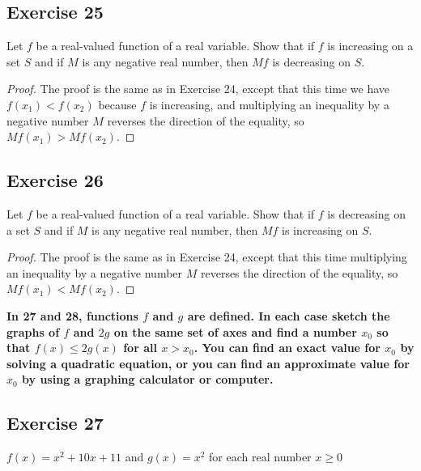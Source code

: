 \documentclass[14pt]{extarticle}
\newcommand{\cy}{\color{cyan}}
\begin{document}
\subsection{Exercise 25}
Let \(f\) be a real-valued function of a real variable. Show that if \(f\) is increasing on a set \(S\) and if \(M\) is any
negative real number, then \(Mf\) is decreasing on \(S\).

\begin{proof}
    The proof is the same as in Exercise 24, except that this time we have \(f(x_1) < f(x_2)\) because \(f\) is increasing, and
    multiplying an inequality by a negative number \(M\) reverses
    the direction of the equality, so \(Mf(x_1) > Mf(x_2)\).
\end{proof}

\subsection{Exercise 26}
Let \(f\) be a real-valued function of a real variable. Show that if \(f\) is decreasing on a set \(S\) and if \(M\) is any
negative real number, then \(Mf\) is increasing on \(S\).

\begin{proof}
    The proof is the same as in Exercise 24, except that this time
    multiplying an inequality by a negative number \(M\) reverses
    the direction of the equality, so \(Mf(x_1) < Mf(x_2)\).
\end{proof}

{\bf \cy In 27 and 28, functions \(f\) and \(g\) are defined. In each case sketch the graphs of \(f\) and \(2g\) on the same
set of axes and find a number \(x_0\) so that \(f(x) \leq 2g(x)\) for all \(x > x_0\). You can find an exact value for
\(x_0\) by solving a quadratic equation, or you can find an approximate value for \(x_0\) by using a graphing calculator
or computer.}

\subsection{Exercise 27}
\(f(x) = x^2 + 10x + 11\) and \(g(x) = x^2\) for each real number \(x \geq 0\)
\end{document}
